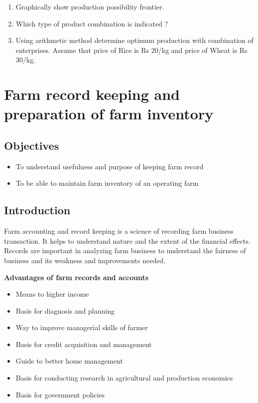 \documentclass[
]{article}
\providecommand{\tightlist}{%
  \setlength{\itemsep}{0pt}\setlength{\parskip}{0pt}}
\begin{document}
\begin{enumerate}
\def\labelenumi{\arabic{enumi}.}
\tightlist
\item
  Graphically show production possibility frontier.
\item
  Which type of product combination is indicated ?
\item
  Using arithmetic method determine optimum production with combination of enterprises. Assume that price of Rice is Rs 20/kg and price of Wheat is Rs 30/kg.
\end{enumerate}

\clearpage

\hypertarget{farm-record-keeping-and-preparation-of-farm-inventory}{%
\section{Farm record keeping and preparation of farm inventory}\label{farm-record-keeping-and-preparation-of-farm-inventory}}

\hypertarget{objectives-3}{%
\subsection*{Objectives}\label{objectives-3}}

\begin{itemize}
\tightlist
\item
  To understand usefulness and purpose of keeping farm record
\item
  To be able to maintain farm inventory of an operating farm
\end{itemize}

\hypertarget{introduction}{%
\subsection*{Introduction}\label{introduction}}

Farm accounting and record keeping is a science of recording farm business transaction. It helps to understand nature and the extent of the financial effects. Records are important in analyzing farm business to understand the fairness of business and its weakness and improvements needed.

\textbf{Advantages of farm records and accounts}

\begin{itemize}
\tightlist
\item
  Means to higher income
\item
  Basis for diagnosis and planning
\item
  Way to improve managerial skills of farmer
\item
  Basis for credit acquisition and management
\item
  Guide to better home management
\item
  Basis for conducting research in agricultural and production economics
\item
  Basis for government policies
\end{itemize}
\end{document}
